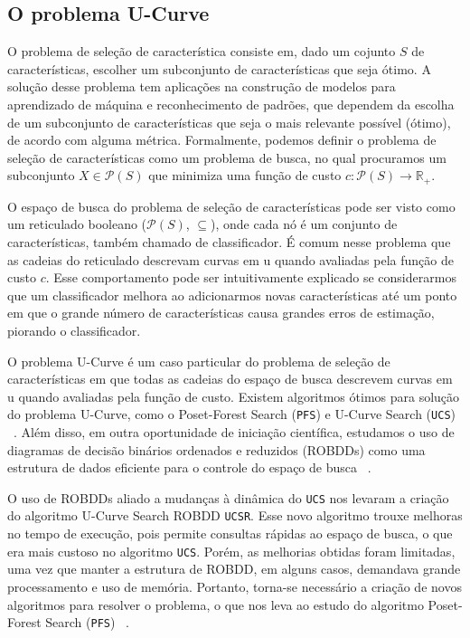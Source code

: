 \documentclass[12pt]{article}
\begin{document}
\subsection{O problema U-Curve}
O problema de seleção de característica consiste em, dado um cojunto $S$
de características, escolher um subconjunto de características que seja
ótimo. A solução desse problema tem aplicações na construção de modelos
para aprendizado de máquina e reconhecimento de padrões, que dependem da
escolha de um subconjunto de características que seja o mais relevante 
possível (ótimo), de acordo com alguma métrica. Formalmente, podemos 
definir o problema de seleção de características como um problema de 
busca, no qual procuramos um subconjunto $X \in \mathcal{P}(S)$ que 
minimiza uma função de custo $c : \mathcal{P}(S) \to \mathbb{R_+}$.

O espaço de busca do problema de seleção de características pode ser
visto como um reticulado booleano ($\mathcal{P}(S)$, $\subseteq$), onde
cada nó é um conjunto de características, também chamado de 
classificador. É comum nesse problema que as cadeias do reticulado
descrevam curvas em u quando avaliadas pela  função de custo $c$. Esse
comportamento pode ser intuitivamente explicado se considerarmos que um 
classificador melhora ao adicionarmos novas características até um ponto
em que o grande número de características causa grandes erros de 
estimação, piorando o classificador. 

O problema U-Curve é um caso particular do problema de seleção de
características em que todas as cadeias do espaço de busca descrevem
curvas em u quando avaliadas pela função de custo. Existem algoritmos
ótimos para solução do problema U-Curve, como o Poset-Forest Search
({\tt PFS}) e U-Curve Search ({\tt UCS}) ~\cite{msreis thesis}. Além 
disso, em outra oportunidade de iniciação científica, estudamos o uso
de diagramas de decisão binários ordenados e reduzidos (ROBDDs) como uma
estrutura de dados eficiente para o controle do espaço de busca 
~\cite{ucsrobdd ic}.

O uso de ROBDDs aliado a mudanças à dinâmica do {\tt UCS} nos levaram a 
criação do algoritmo U-Curve Search ROBDD {\tt UCSR}. Esse novo 
algoritmo trouxe melhoras no tempo de execução, pois permite consultas
rápidas ao espaço de busca, o que era mais custoso no algoritmo
{\tt UCS}. Porém, as melhorias obtidas foram limitadas, uma vez que
manter a estrutura de ROBDD, em alguns casos, demandava grande 
processamento e uso de memória. Portanto, torna-se necessário a criação
de novos algoritmos para resolver o problema, o que nos leva ao estudo
do algoritmo Poset-Forest Search ({\tt PFS}) ~\cite{msreis thesis}.
\end{document}
